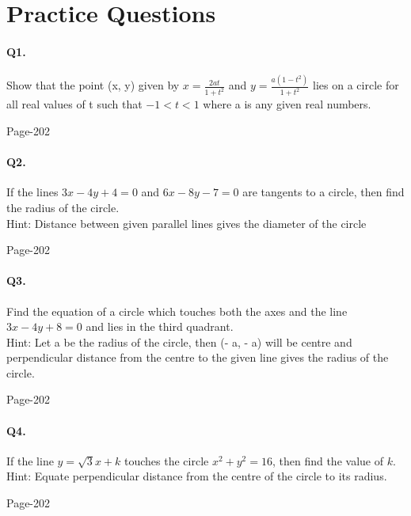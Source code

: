 \documentclass{article}
\begin{document}
\section*{Practice Questions}
\paragraph{Q1.}Show that the point (x, y) given by $x=\frac{2at}{1+t^2}$ and $y=\frac{a(1-t^2)}{1+t^2}$ lies on a circle for all real values of t such that $-1 <  t < 1$ where a is any given real numbers.

\begin{flushright}
Page-202
\end{flushright}

\paragraph{Q2.}If the lines $3x - 4y + 4 = 0$ and $6x - 8y - 7 = 0$ are tangents to a circle, then find
the radius of the circle.\\
Hint: Distance between given parallel lines gives the diameter of the circle
\begin{flushright}
Page-202
\end{flushright}

\paragraph{Q3.}Find the equation of a circle which touches both the axes and the line $3x - 4y + 8 = 0$
and lies in the third quadrant.\\
Hint:  Let  a  be  the  radius  of  the  circle,  then  (-  a,  -  a)  will  be  centre  and perpendicular distance from the centre to the given line gives the radius of the
circle.
\begin{flushright}
Page-202
\end{flushright}

\paragraph{Q4.}If the line $y = \sqrt{3}  x + k$ touches the circle $x^2 + y^2 = 16$, then find the value of $k$.\\
Hint: Equate perpendicular distance from the centre of the circle to its radius.
\begin{flushright}
Page-202
\end{flushright}

\clearpage
\end{document}
